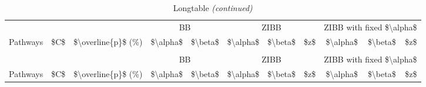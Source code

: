 
\begin{longtable}[t]{lrrrrrrrrrr}
\caption{Longtable}\\
\toprule
\multicolumn{3}{c}{ } & \multicolumn{2}{c}{BB} & \multicolumn{3}{c}{ZIBB} & \multicolumn{3}{c}{ZIBB with fixed \$\textbackslash{}alpha\$} \\
\cmidrule(l{3pt}r{3pt}){4-5} \cmidrule(l{3pt}r{3pt}){6-8} \cmidrule(l{3pt}r{3pt}){9-11}
Pathways & \$C\$ & \$\textbackslash{}overline\{p\}\$ (\%) & \$\textbackslash{}alpha\$ & \$\textbackslash{}beta\$ & \$\textbackslash{}alpha\$ & \$\textbackslash{}beta\$ & \$z\$ & \$\textbackslash{}alpha\$ & \$\textbackslash{}beta\$ & \$z\$\\
\midrule
\endfirsthead
\caption[]{Longtable \textit{(continued)}}\\
\toprule
\multicolumn{3}{c}{ } & \multicolumn{2}{c}{BB} & \multicolumn{3}{c}{ZIBB} & \multicolumn{3}{c}{ZIBB with fixed \$\textbackslash{}alpha\$} \\
\cmidrule(l{3pt}r{3pt}){4-5} \cmidrule(l{3pt}r{3pt}){6-8} \cmidrule(l{3pt}r{3pt}){9-11}
Pathways & \$C\$ & \$\textbackslash{}overline\{p\}\$ (\%) & \$\textbackslash{}alpha\$ & \$\textbackslash{}beta\$ & \$\textbackslash{}alpha\$ & \$\textbackslash{}beta\$ & \$z\$ & \$\textbackslash{}alpha\$ & \$\textbackslash{}beta\$ & \$z\$\\
\midrule
\endhead


\end{longtable}
